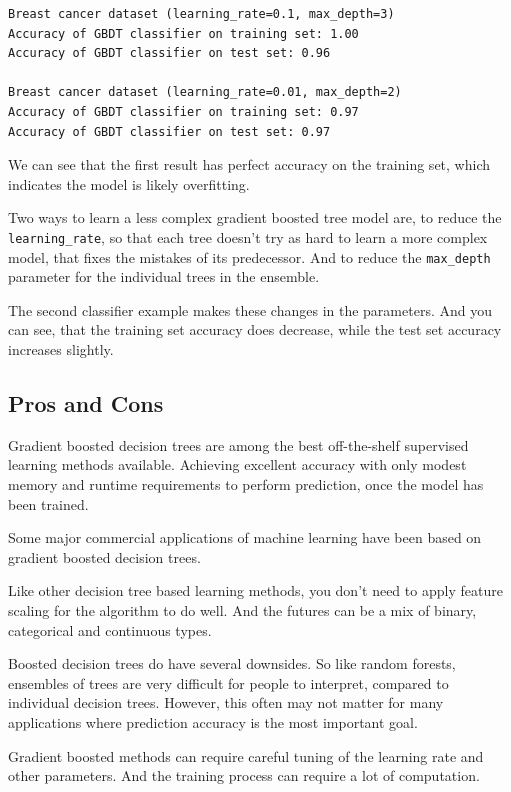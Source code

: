 \begin{multicols}{2}
{\scriptsize
\begin{verbatim}
Breast cancer dataset (learning_rate=0.1, max_depth=3)
Accuracy of GBDT classifier on training set: 1.00
Accuracy of GBDT classifier on test set: 0.96

Breast cancer dataset (learning_rate=0.01, max_depth=2)
Accuracy of GBDT classifier on training set: 0.97
Accuracy of GBDT classifier on test set: 0.97
\end{verbatim}
}

We can see that the first result has perfect accuracy on the training set, which indicates the model is likely overfitting. 

Two ways to learn a less complex gradient boosted tree model are, to reduce the \texttt{learning_rate}, so that each tree doesn't try as hard to learn a more complex model, that fixes the mistakes of its predecessor. And to reduce the \texttt{max_depth} parameter for the individual trees in the ensemble. 

The second classifier example makes these changes in the parameters. And you can see, that the training set accuracy does decrease, while the test set accuracy increases slightly. 

\subsection{Pros and Cons}

Gradient boosted decision trees are among the best off-the-shelf supervised learning methods available. Achieving excellent accuracy with only modest memory and runtime requirements to perform prediction, once the model has been trained. 

Some major commercial applications of machine learning have been based on gradient boosted decision trees. 

Like other decision tree based learning methods, you don't need to apply feature scaling for the algorithm to do well. And the futures can be a mix of binary, categorical and continuous types. 

Boosted decision trees do have several downsides. So like random forests, ensembles of trees are very difficult for people to interpret, compared to individual decision trees. However, this often may not matter for many applications where prediction accuracy is the most important goal. 

Gradient boosted methods can require careful tuning of the learning rate and other parameters. And the training process can require a lot of computation. 


\end{multicols}
